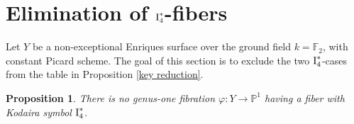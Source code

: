 \documentclass[oneside, 12pt]{amsart}
\newcommand\mylabel[1]{\label{#1}\marginpar{\vspace{-1ex}\medskip\medskip\footnotesize \tt #1}}
\renewcommand\mylabel[1]{\label{#1}}
\newtheorem{proposition}[theorem]{Proposition}
\theoremstyle{definition}
\theoremstyle{remark}
\newcommand{\FF}{\mathbb{F}}
\newcommand{\PP}{\mathbb{P}}
\newcommand{\I}{\text{\rm I}}
\newcommand{\ra}{\rightarrow}
\newcommand{\ind}{\text{\rm ind}}
\newcommand{\inv}{{-1}}
\begin{document}
% 

\section{Elimination of \texorpdfstring{$\I_4^*$}{I4*}-fibers}
\mylabel{Elimination I4*}

Let $Y$ be a non-exceptional Enriques surface over the ground field $k=\FF_2$,  with constant Picard scheme.
The goal of this section is   to exclude the two $\I_4^*$-cases from the table in Proposition \ref{key reduction}.

\begin{proposition}
\mylabel{no I4*}
There is no genus-one fibration 
$\varphi:Y\ra\PP^1$ having a fiber  with Kodaira symbol $\I_4^*$. 
\end{proposition}
\end{document}
